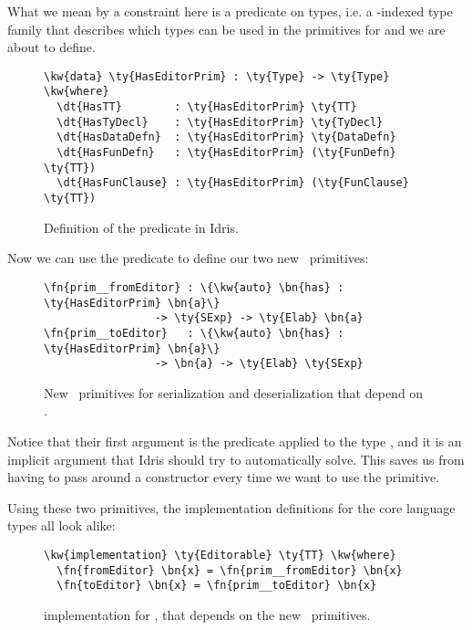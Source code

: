 What we mean by a constraint here is a predicate on types,
i.e. a -indexed type family that describes which types can be used in
the primitives for  and  we are about to define.

\begin{figure}[H]
\begin{Verbatim}[framesep=2mm, label=\footnotesize{\normalfont{Idris}}, labelposition=topline]
\kw{data} \ty{HasEditorPrim} : \ty{Type} -> \ty{Type} \kw{where}
  \dt{HasTT}        : \ty{HasEditorPrim} \ty{TT}
  \dt{HasTyDecl}    : \ty{HasEditorPrim} \ty{TyDecl}
  \dt{HasDataDefn}  : \ty{HasEditorPrim} \ty{DataDefn}
  \dt{HasFunDefn}   : \ty{HasEditorPrim} (\ty{FunDefn} \ty{TT})
  \dt{HasFunClause} : \ty{HasEditorPrim} (\ty{FunClause} \ty{TT})
\end{Verbatim}
\caption{Definition of the  predicate in Idris.}
\end{figure}

Now we can use the predicate  to define our two new
\Elab\ primitives:

\begin{figure}[H]
\begin{Verbatim}[framesep=2mm, label=\footnotesize{\normalfont{Idris}}, labelposition=topline]
\fn{prim__fromEditor} : \{\kw{auto} \bn{has} : \ty{HasEditorPrim} \bn{a}\}
                 -> \ty{SExp} -> \ty{Elab} \bn{a}
\fn{prim__toEditor}   : \{\kw{auto} \bn{has} : \ty{HasEditorPrim} \bn{a}\}
                 -> \bn{a} -> \ty{Elab} \ty{SExp}
\end{Verbatim}
\caption{New \Elab\ primitives for serialization and deserialization that depend on .}
\label{code:newElabPrims}
\end{figure}

Notice that their first argument is the predicate  applied to
the type , and it is an implicit argument that Idris should try to
automatically solve. This saves us from having to pass around a constructor
every time we want to use the primitive.

Using these two primitives, the  implementation definitions for
the core language types all look alike:

\begin{figure}[H]
\begin{Verbatim}[framesep=2mm, label=\footnotesize{\normalfont{Idris}}, labelposition=topline]
\kw{implementation} \ty{Editorable} \ty{TT} \kw{where}
  \fn{fromEditor} \bn{x} = \fn{prim__fromEditor} \bn{x}
  \fn{toEditor} \bn{x} = \fn{prim__toEditor} \bn{x}
\end{Verbatim}
\caption{ implementation for \TT, that depends on the new \Elab\ primitives.}
\end{figure}

